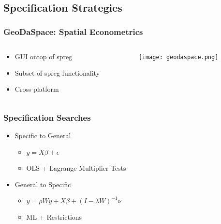 \documentclass[usepdftitle=false,professionalfonts,compress ]{beamer}
\begin{document}
\subsection{Specification Strategies}






{
\begin{frame}\frametitle{GeoDaSpace: Spatial Econometrics}
\begin{columns}
	\begin{column}{0.65\textwidth}
	\begin{itemize}

		\item GUI ontop of spreg
		\item Subset of spreg functionality
		\item Cross-platform
	\end{itemize}
	\end{column}
\begin{column}{0.53\textwidth}

\begin{figure}
	\texttt{[image: geodaspace.png]}\end{figure}\end{column}
\end{columns}

\end{frame}
}







{
\begin{frame}\frametitle{Specification Searches}
	\begin{itemize}

		\item Specific to General
		\begin{itemize}

			\item $y=X\beta + \epsilon$
			\item OLS + Lagrange Multiplier Tests
		\end{itemize}
		\item General to Specific
		\begin{itemize}

			\item $y = \rho W y + X\beta + (I-\lambda W)^{-1} \nu$
			\item ML + Restrictions
		\end{itemize}
	\end{itemize}

\end{frame}
}
\end{document}
